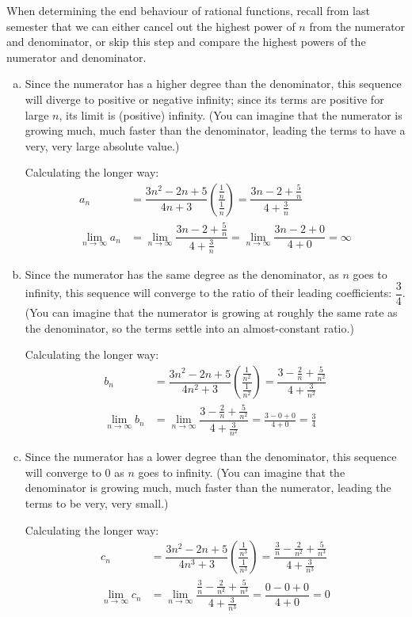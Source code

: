 \begin{solution}
When determining the end behaviour of rational functions, recall from last semester that we can either cancel out the highest power of $n$ from the numerator and denominator, or skip this step and compare the highest powers of the numerator and denominator.

\begin{enumerate}[(a)]
\item Since the numerator has a higher degree than the denominator, this sequence will diverge to positive or negative infinity; since its terms are positive for large $n$, its limit is (positive) infinity. (You can imagine that the numerator is growing much, much faster than the denominator, leading the terms to have a very, very large absolute value.)

Calculating the longer way:
\begin{align*}
a_n &= \dfrac{3n^2-2n+5}{4n+3}\left(\dfrac{\frac1n}{\frac1n}\right)=\dfrac{3n-2+\frac5n}{4+\frac3n}
\\\lim_{n \to \infty}a_n &= \lim_{n \to \infty}\dfrac{3n-2+\frac5n}{4+\frac3n} =
\lim_{n \to \infty}\dfrac{3n-2+0}{4+0} = \infty
\end{align*}

\item
Since the numerator has the same degree as the denominator, as $n$ goes to infinity, this sequence will converge to the ratio of their leading coefficients: $\dfrac{3}{4}$.
(You can imagine that the numerator is growing at roughly the same rate as the denominator, so the terms settle into an almost-constant ratio.)

Calculating the longer way:
\begin{align*}
b_n &= \dfrac{3n^2-2n+5}{4n^2+3}\left(\dfrac{\frac{1}{n^2}}{\frac{1}{n^2}}\right)=\dfrac{3-\frac2n+\frac{5}{n^2}}{4+\frac{3}{n^2}}
\\\lim_{n \to \infty}b_n &= \lim_{n \to \infty}\dfrac{3-\frac2n+\frac{5}{n^2}}{4+\frac{3}{n^2}} = \frac{3-0+0}{4+0}=\frac{3}{4}
\end{align*}

\item Since the numerator has a lower degree than the denominator, this sequence will converge to 0 as $n$ goes to infinity. (You can imagine that the denominator is growing much, much faster than the numerator, leading the terms to be very, very small.)

Calculating the longer way:
\begin{align*}
c_n &= \dfrac{3n^2-2n+5}{4n^3+3}\left(\dfrac{\frac{1}{n^3}}{\frac{1}{n^3}}\right)=\dfrac{\frac{3}{n}-\frac{2}{n^2}+\frac{5}{n^3}}{4+\frac{3}{n^3}}
\\\lim_{n \to \infty}c_n &= \lim_{n \to \infty}\dfrac{\frac{3}{n}-\frac{2}{n^2}+\frac{5}{n^3}}{4+\frac{3}{n^3}} = \dfrac{0-0+0}{4+0}=0
\end{align*}
\end{enumerate}
\end{solution}


